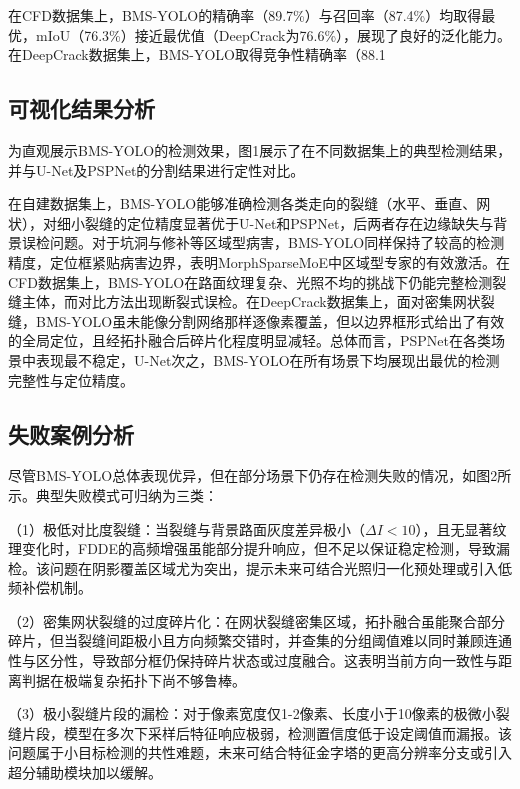 \documentclass[twocolumn]{sn-jnl}
\begin{document}
	在CFD数据集上，BMS-YOLO的精确率（89.7\%）与召回率（87.4\%）均取得最优，mIoU（76.3\%）接近最优值（DeepCrack为76.6\%），展现了良好的泛化能力。在DeepCrack数据集上，BMS-YOLO取得竞争性精确率（88.1%
	
	\subsection{可视化结果分析}
	为直观展示BMS-YOLO的检测效果，图1展示了在不同数据集上的典型检测结果，并与U-Net及PSPNet的分割结果进行定性对比。
	
	在自建数据集上，BMS-YOLO能够准确检测各类走向的裂缝（水平、垂直、网状），对细小裂缝的定位精度显著优于U-Net和PSPNet，后两者存在边缘缺失与背景误检问题。对于坑洞与修补等区域型病害，BMS-YOLO同样保持了较高的检测精度，定位框紧贴病害边界，表明MorphSparseMoE中区域型专家的有效激活。在CFD数据集上，BMS-YOLO在路面纹理复杂、光照不均的挑战下仍能完整检测裂缝主体，而对比方法出现断裂式误检。在DeepCrack数据集上，面对密集网状裂缝，BMS-YOLO虽未能像分割网络那样逐像素覆盖，但以边界框形式给出了有效的全局定位，且经拓扑融合后碎片化程度明显减轻。总体而言，PSPNet在各类场景中表现最不稳定，U-Net次之，BMS-YOLO在所有场景下均展现出最优的检测完整性与定位精度。
	
	\subsection{失败案例分析}
	尽管BMS-YOLO总体表现优异，但在部分场景下仍存在检测失败的情况，如图2所示。典型失败模式可归纳为三类：
	
	（1）极低对比度裂缝：当裂缝与背景路面灰度差异极小（\(\Delta I < 10\)），且无显著纹理变化时，FDDE的高频增强虽能部分提升响应，但不足以保证稳定检测，导致漏检。该问题在阴影覆盖区域尤为突出，提示未来可结合光照归一化预处理或引入低频补偿机制。
	
	（2）密集网状裂缝的过度碎片化：在网状裂缝密集区域，拓扑融合虽能聚合部分碎片，但当裂缝间距极小且方向频繁交错时，并查集的分组阈值难以同时兼顾连通性与区分性，导致部分框仍保持碎片状态或过度融合。这表明当前方向一致性与距离判据在极端复杂拓扑下尚不够鲁棒。
	
	（3）极小裂缝片段的漏检：对于像素宽度仅1-2像素、长度小于10像素的极微小裂缝片段，模型在多次下采样后特征响应极弱，检测置信度低于设定阈值而漏报。该问题属于小目标检测的共性难题，未来可结合特征金字塔的更高分辨率分支或引入超分辅助模块加以缓解。
	
\end{document}
